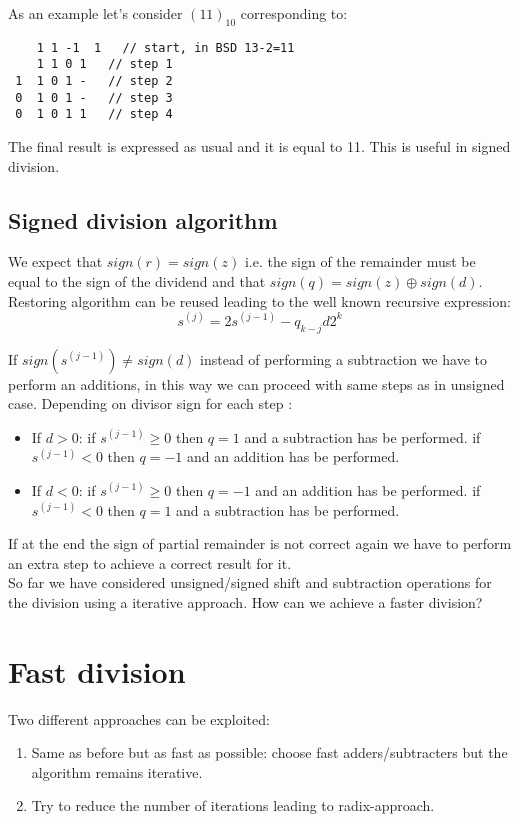 As an example let's consider $(11)_{10}$ corresponding to:
\begin{verbatim}
    1 1 -1  1   // start, in BSD 13-2=11
    1 1 0 1   // step 1
 1  1 0 1 -   // step 2
 0  1 0 1 -   // step 3
 0  1 0 1 1   // step 4
\end{verbatim}

The final result is expressed as usual and it is equal to 11. This is useful in signed division.

\subsection{Signed division algorithm}

We expect that $sign(r)=sign(z)$ i.e. the sign of the remainder must be equal to the sign of the dividend and that $sign(q)=sign(z) \oplus sign(d)$. Restoring algorithm can be reused leading to the well known recursive expression:
$$s^{(j)}=2s^{(j-1)}-q_{k-j}d2^k$$

If $sign(s^{(j-1)}) \neq sign(d)$ instead of performing a subtraction we have to perform an additions, in this way we can proceed with same steps as in unsigned case. Depending on divisor sign for each step :
\begin{itemize}
  \item If $d>0$:
    \subitem if $s^{(j-1)} \geq 0$ then $q=1$ and a subtraction has be performed.
    \subitem if $s^{(j-1)} < 0$ then $q=-1$ and an addition has be performed.
  \item If $d<0$:
    \subitem if $s^{(j-1)} \geq 0$ then $q=-1$ and an addition has be performed.
    \subitem if $s^{(j-1)} < 0$ then $q=1$ and a subtraction has be performed.
\end{itemize}

If at the end the sign of partial remainder is not correct again we have to perform an extra step to achieve a correct result for it.\\

So far we have considered unsigned/signed shift and subtraction operations for the division using a iterative approach. How can we achieve a faster division?

\section{Fast division}
Two different approaches can be exploited:
\begin{enumerate}
  \item Same as before but as fast as possible: choose fast adders/subtracters but the algorithm remains iterative.
  \item Try to reduce the number of iterations leading to radix-approach.
\end{enumerate}

